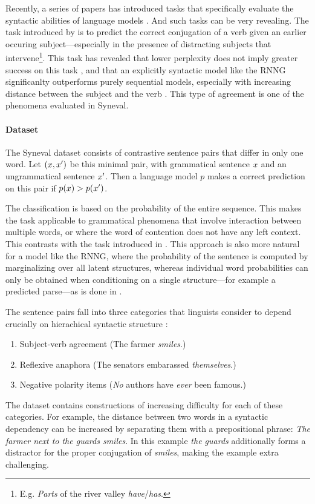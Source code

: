 Recently, a series of papers has introduced tasks that specifically evaluate the syntactic abilities of language models \citep{linzen2016syntax,gulordava2018colorless,linzen2018targeted}. And such tasks can be very revealing. The task introduced by \citet{linzen2016syntax} is to predict the correct conjugation of a verb given an earlier occuring subject---especially in the presence of distracting subjects that intervene\footnote{E.g. \textit{Parts} of the river valley \textit{have}/\textit{has}.}. This task has revealed that lower perplexity does not imply greater success on this task \citep{tran2018recurrent}, and that an explicitly syntactic model like the RNNG significanlty outperforms purely sequential models, especially with increasing distance between the subject and the verb \citep{kuncoro2018learn}. This type of agreement is one of the phenomena evaluated in Syneval.

\paragraph{Dataset}
The Syneval dataset consists of contrastive sentence pairs that differ in only one word. Let $(x, x')$ be this minimal pair, with grammatical sentence $x$ and an ungrammatical sentence $x'$. Then a language model $p$ makes a correct prediction on this pair if $p(x) > p(x')$.

The classification is based on the probability of the entire sequence. This makes the task applicable to grammatical phenomena that involve interaction between multiple words, or where the word of contention does not have any left context. This contrasts with the task introduced in \citet{linzen2016syntax}. This approach is also more natural for a model like the RNNG, where the probability of the sentence is computed by marginalizing over all latent structures, whereas individual word probabilities can only be obtained when conditioning on a single structure---for example a predicted parse---as is done in \cite{kuncoro2018learn}.

The sentence pairs fall into three categories that linguists consider to depend crucially on hierachical syntactic structure \citep{everaert2015structures,xiang2009illusory}:
  \begin{enumerate}[noitemsep]
    \item Subject-verb agreement (The farmer \textit{smiles}.)
    \item Reflexive anaphora (The senators embarassed \textit{themselves}.)
    \item Negative polarity items (\textit{No} authors have \textit{ever} been famous.)
  \end{enumerate}
The dataset contains constructions of increasing difficulty for each of these categories. For example, the distance between two words in a syntactic dependency can be increased by separating them with a prepositional phrase: \textit{The farmer next to the guards smiles}. In this example \textit{the guards} additionally forms a distractor for the proper conjugation of \textit{smiles}, making the example extra challenging.

